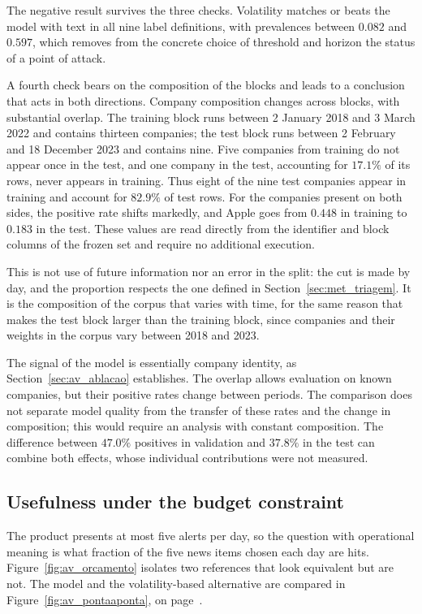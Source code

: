 The negative result survives the three checks. Volatility matches or beats the model with text in
all nine label definitions, with prevalences between $0.082$ and $0.597$, which removes from the
concrete choice of threshold and horizon the status of a point of attack.

A fourth check bears on the composition of the blocks and leads to a conclusion that acts in both
directions. Company composition changes across blocks, with substantial overlap. The training block runs between 2 January 2018
and 3 March 2022 and contains thirteen companies; the test block runs between 2 February and 18
December 2023 and contains nine. Five companies from training do not appear once in the test, and
one company in the test, accounting for $17.1\%$ of its rows, never appears in training.
Thus eight of the nine test companies appear in training and account for $82.9\%$ of test rows. For the
companies present on both sides, the positive rate shifts markedly, and Apple goes from $0.448$ in
training to $0.183$ in the test. These values are read directly from the identifier and block
columns of the frozen set and require no additional execution.

This is not use of future information nor an error in the split: the cut is made by day, and the
proportion respects the one defined in Section~\ref{sec:met_triagem}. It is the composition of the
corpus that varies with time, for the same reason that makes the test block larger than the
training block, since companies and their weights in the corpus vary between 2018 and 2023.

The signal of the model is essentially company identity, as Section~\ref{sec:av_ablacao}
establishes. The overlap allows evaluation on known companies, but their positive rates change
between periods. The comparison does not separate model quality from the transfer of these rates
and the change in composition; this would require an analysis with constant composition. The
difference between $47.0\%$ positives in validation and $37.8\%$ in the test can combine both
effects, whose individual contributions were not measured.

\subsection{Usefulness under the budget constraint}

The product presents at most five alerts per day, so the question with operational meaning is what
fraction of the five news items chosen each day are hits. Figure~\ref{fig:av_orcamento} isolates
two references that look equivalent but are not. The model and the volatility-based alternative are
compared in Figure~\ref{fig:av_pontaaponta}, on page~\pageref{fig:av_pontaaponta}.

